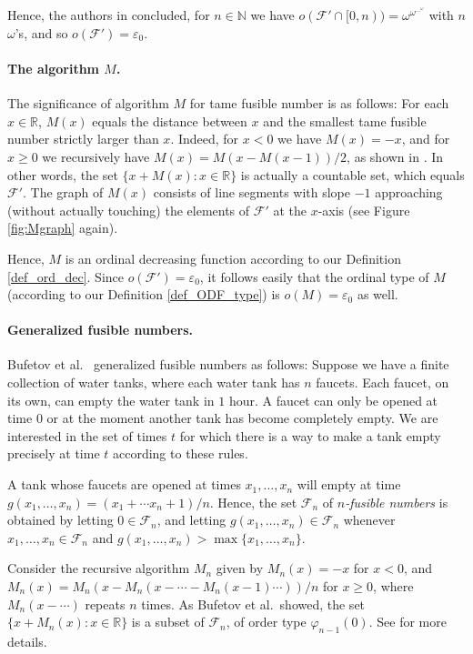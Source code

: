 \documentclass{article}
\theoremstyle{definition}
\newcommand{\N}{\mathbb N}
\newcommand{\R}{\mathbb R}
\newcommand{\ff}{\mathcal F}
\begin{document}
Hence, the authors in \cite{ENX} concluded, for $n\in\N$ we have $o(\ff'\cap[0,n))= \omega^{\omega^{\cdots^\omega}}$ with $n$ $\omega$'s, and so $o(\ff')=\varepsilon_0$.

\paragraph{\boldmath The algorithm $M$.} The significance of algorithm $M$ for tame fusible number is as follows: For each $x\in \R$, $M(x)$ equals the distance between $x$ and the smallest tame fusible number strictly larger than $x$. Indeed, for $x<0$ we have $M(x)=-x$, and for $x\ge 0$ we recursively have $M(x)=M(x-M(x-1))/2$, as shown in \cite{ENX}. In other words, the set $\{x+M(x):x\in\R\}$ is actually a countable set, which equals $\ff'$. The graph of $M(x)$ consists of line segments with slope $-1$ approaching (without actually touching) the elements of $\ff'$ at the $x$-axis (see Figure \ref{fig:Mgraph} again).

Hence, $M$ is an ordinal decreasing function according to our Definition \ref{def_ord_dec}. Since $o(\ff')=\varepsilon_0$, it follows easily that the ordinal type of $M$ (according to our Definition \ref{def_ODF_type}) is $o(M)=\varepsilon_0$ as well.

\paragraph{Generalized fusible numbers.} Bufetov et al.~\cite{BNP} generalized fusible numbers as follows: Suppose we have a finite collection of water tanks, where each water tank has $n$ faucets. Each faucet, on its own, can empty the water tank in $1$ hour. A faucet can only be opened at time $0$ or at the moment another tank has become completely empty. We are interested in the set of times $t$ for which there is a way to make a tank empty precisely at time $t$ according to these rules.

A tank whose faucets are opened at times $x_1, \ldots, x_n$ will empty at time $g(x_1,\ldots,x_n)=(x_1 + \cdots x_n + 1)/n$. Hence, the set $\mathcal F_n$ of \emph{$n$-fusible numbers} is obtained by letting $0\in\mathcal F_n$, and letting $g(x_1,\ldots,x_n)\in\mathcal F_n$ whenever $x_1,\ldots,x_n\in \mathcal F_n$ and $g(x_1,\ldots,x_n)>\max\{x_1,\ldots,x_n\}$.

Consider the recursive algorithm $M_n$ given by $M_n(x)=-x$ for $x<0$, and $M_n(x)=M_n(x-M_n(x-\cdots-M_n(x-1)\cdots))/n$ for $x\ge 0$, where $M_n(x-\cdots)$ repeats $n$ times. As Bufetov et al.~showed, the set $\{x+M_n(x):x\in\R\}$ is a subset of $\mathcal F_n$, of order type $\varphi_{n-1}(0)$. See \cite{BNP} for more details.
    
\end{document}

